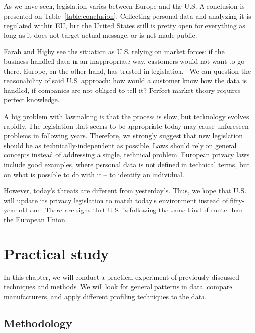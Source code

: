 \documentclass[12pt,a4paper,oneside,pdftex]{report}
\begin{document}
As we have seen, legislation varies between Europe and the U.S. A conclusion is presented on Table~\ref{table:conclusion}. Collecting personal data and analyzing it is regulated within EU, but the United States still is pretty open for everything as long as it does not target actual message, or is not made public.

Farah and Higby see the situation as U.S. relying on market forces: if the business handled data in an inappropriate way, customers would not want to go there. Europe, on the other hand, has trusted in legislation.~\cite{farah2001commerce} We can question the reasonability of said U.S. approach: how would a customer know how the data is handled, if companies are not obliged to tell it? Perfect market theory requires perfect knowledge.

A big problem with lawmaking is that the process is slow, but technology evolves rapidly. The legislation that seems to be appropriate today may cause unforeseen problems in following years. Therefore, we strongly suggest that new legislation should be as technically-independent as possible. Laws should rely on general concepts instead of addressing a single, technical problem. European privacy laws include good examples, where personal data is not defined in technical terms, but on what is possible to do with it -- to identify an individual.

However, today's threats are different from yesterday's. Thus, we hope that U.S. will update its privacy legislation to match today's environment instead of fifty-year-old one. There are signs that U.S. is following the same kind of route than the European Union.



\chapter{Practical study}
\label{chapter:practical}

In this chapter, we will conduct a practical experiment of previously discussed techniques and methods. We will look for general patterns in data, compare manufacturers, and apply different profiling techniques to the data. 

\section{Methodology}
\label{sec:methods}
\end{document}
